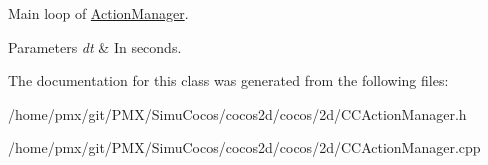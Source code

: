 Main loop of \hyperlink{classActionManager}{Action\+Manager}. 
\begin{DoxyParams}{Parameters}
{\em dt} & In seconds. \\
\hline
\end{DoxyParams}


The documentation for this class was generated from the following files\+:\begin{DoxyCompactItemize}
\item 
/home/pmx/git/\+P\+M\+X/\+Simu\+Cocos/cocos2d/cocos/2d/C\+C\+Action\+Manager.\+h\item 
/home/pmx/git/\+P\+M\+X/\+Simu\+Cocos/cocos2d/cocos/2d/C\+C\+Action\+Manager.\+cpp\end{DoxyCompactItemize}

